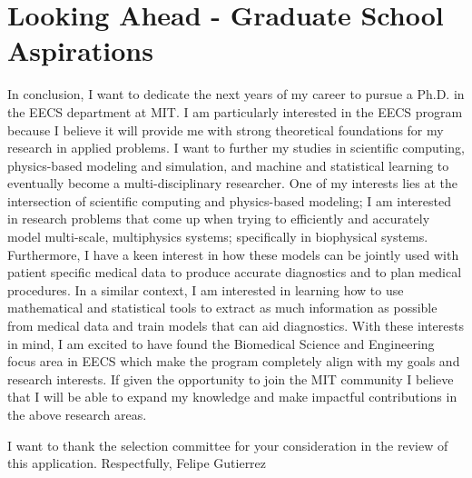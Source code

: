 \documentclass{article}
\theoremstyle{definition}
\begin{document}
\section*{Looking Ahead - Graduate School Aspirations}

In conclusion, I want to dedicate the next years of my career to pursue a Ph.D. in the EECS department at MIT. I am particularly interested in the EECS program because I believe it will provide me with strong theoretical foundations for my research in applied problems. I want to further my studies in scientific computing, physics-based modeling and simulation, and machine and statistical learning to eventually become a multi-disciplinary researcher. One of my interests lies at the intersection of scientific computing and physics-based modeling; I am interested in research problems that come up when trying to efficiently and accurately model multi-scale, multiphysics systems; specifically in biophysical systems. Furthermore, I have a keen interest in how these models can be jointly used with patient specific medical data to produce accurate diagnostics and to plan medical procedures. In a similar context, I am interested in learning how to use mathematical and statistical tools to extract as much information as possible from medical data and train models that can aid diagnostics. With these interests in mind, I am excited to have found the Biomedical Science and Engineering focus area in EECS which make the program completely align with my goals and research interests. If given the opportunity to join the MIT community I believe that I will be able to expand my knowledge and make impactful contributions in the above research areas.\linebreak

I want to thank the selection committee for your consideration in the review of this application.\linebreak
\linebreak
Respectfully,\linebreak
Felipe Gutierrez




\end{document}
